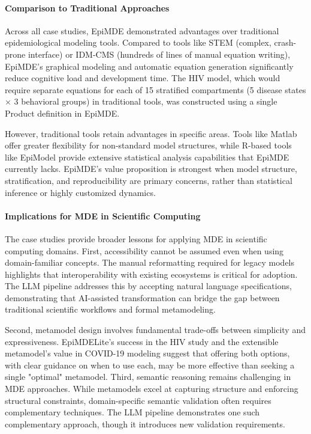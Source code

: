 \paragraph{Comparison to Traditional Approaches}

Across all case studies, EpiMDE demonstrated advantages over traditional epidemiological modeling tools. Compared to tools like STEM (complex, crash-prone interface) or IDM-CMS (hundreds of lines of manual equation writing), EpiMDE's graphical modeling and automatic equation generation significantly reduce cognitive load and development time. The HIV model, which would require separate equations for each of 15 stratified compartments (5 disease states × 3 behavioral groups) in traditional tools, was constructed using a single Product definition in EpiMDE.

However, traditional tools retain advantages in specific areas. Tools like Matlab offer greater flexibility for non-standard model structures, while R-based tools like EpiModel provide extensive statistical analysis capabilities that EpiMDE currently lacks. EpiMDE's value proposition is strongest when model structure, stratification, and reproducibility are primary concerns, rather than statistical inference or highly customized dynamics.

\paragraph{Implications for MDE in Scientific Computing}

The case studies provide broader lessons for applying MDE in scientific computing domains. First, accessibility cannot be assumed even when using domain-familiar concepts. The manual reformatting required for legacy models highlights that interoperability with existing ecosystems is critical for adoption. The LLM pipeline addresses this by accepting natural language specifications, demonstrating that AI-assisted transformation can bridge the gap between traditional scientific workflows and formal metamodeling.

Second, metamodel design involves fundamental trade-offs between simplicity and expressiveness. EpiMDELite's success in the HIV study and the extensible metamodel's value in COVID-19 modeling suggest that offering both options, with clear guidance on when to use each, may be more effective than seeking a single "optimal" metamodel. Third, semantic reasoning remains challenging in MDE approaches. While metamodels excel at capturing structure and enforcing structural constraints, domain-specific semantic validation often requires complementary techniques. The LLM pipeline demonstrates one such complementary approach, though it introduces new validation requirements.

